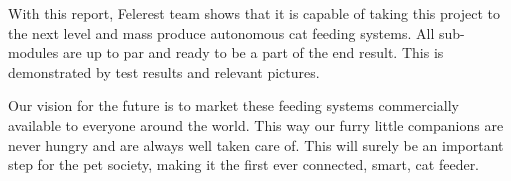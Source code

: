 With this report, Felerest team shows that it is capable of taking this project to the next level and mass produce autonomous cat feeding systems. All sub-modules are up to par and ready to be a part of the end result. This is demonstrated by test results and relevant pictures.

Our vision for the future is to market these feeding systems commercially available to everyone around the world. This way our furry little companions are never hungry and are always well taken care of. This will surely be an important step for the pet society, making it the first ever connected, smart, cat feeder. 